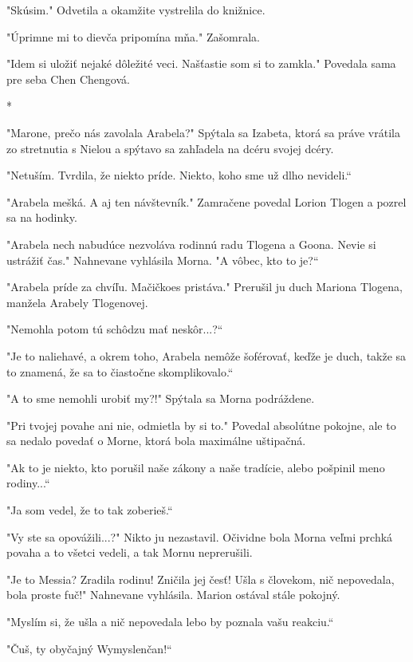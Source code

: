 \documentclass{book}
\begin{document}
"$ $Skúsim."$ $ Odvetila a okamžite vystrelila do knižnice.

"$ $Úprimne mi to dievča pripomína mňa."$ $ Zašomrala.

"$ $Idem si uložiť nejaké dôležité veci. Našťastie som si to zamkla."$ $ Povedala sama pre seba Chen Chengová.

\begin{center}
*
\end{center}

"$ $Marone, prečo nás zavolala Arabela?"$ $ Spýtala sa Izabeta, ktorá sa práve vrátila zo stretnutia s Nielou a spýtavo sa zahľadela na dcéru svojej dcéry.

"$ $Netuším. Tvrdila, že niekto príde. Niekto, koho sme už dlho nevideli.“

"$ $Arabela mešká. A aj ten návštevník."$ $ Zamračene povedal Lorion Tlogen a pozrel sa na hodinky.

"$ $Arabela nech nabudúce nezvoláva rodinnú radu Tlogena a Goona. Nevie si ustrážiť čas."$ $ Nahnevane vyhlásila Morna. "$ $A vôbec, kto to je?“

"$ $Arabela príde za chvíľu. Mačičkoes pristáva."$ $ Prerušil ju duch Mariona Tlogena, manžela Arabely Tlogenovej.

"$ $Nemohla potom tú schôdzu mať neskôr...?“

"$ $Je to naliehavé, a okrem toho, Arabela nemôže šoférovať, keďže je duch, takže sa to znamená, že sa to čiastočne skomplikovalo.“

"$ $A to sme nemohli urobiť my?!"$ $ Spýtala sa Morna podráždene.

"$ $Pri tvojej povahe ani nie, odmietla by si to."$ $ Povedal absolútne pokojne, ale to sa nedalo povedať o Morne, ktorá bola maximálne uštipačná.

"$ $Ak to je niekto, kto porušil naše zákony a naše tradície, alebo pošpinil meno rodiny...“

"$ $Ja som vedel, že to tak zoberieš.“

"$ $Vy ste sa opovážili...?"$ $ Nikto ju nezastavil. Očividne bola Morna veľmi prchká povaha a to všetci vedeli, a tak Mornu neprerušili.

"$ $Je to Messia? Zradila rodinu! Zničila jej česť! Ušla s človekom, nič nepovedala, bola proste fuč!"$ $ Nahnevane vyhlásila. Marion ostával stále pokojný.

"$ $Myslím si, že ušla a nič nepovedala lebo by poznala vašu reakciu.“

"$ $Čuš, ty obyčajný Wymyslenčan!“
\end{document}
